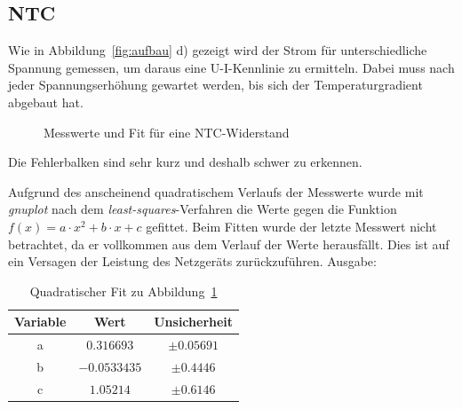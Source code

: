 \subsection{NTC}
Wie in Abbildung~\ref{fig:aufbau} d) gezeigt wird der Strom für unterschiedliche Spannung gemessen, um daraus eine U-I-Kennlinie zu ermitteln. Dabei muss nach jeder Spannungserhöhung gewartet werden, bis sich der Temperaturgradient abgebaut hat. 

\begin{figure}[H]
\centering
{}
\caption{Messwerte und Fit für eine NTC-Widerstand}
\label{fig:ntc}
\end{figure}
Die Fehlerbalken sind sehr kurz und deshalb schwer zu erkennen.

Aufgrund des anscheinend quadratischem Verlaufs der Messwerte wurde mit \emph{gnuplot} nach dem \emph{least-squares}-Verfahren die Werte gegen die Funktion $f(x)=a\cdot x^2+b\cdot x+c$ gefittet. Beim Fitten wurde der letzte Messwert nicht betrachtet, da er vollkommen aus dem Verlauf der Werte herausfällt. Dies ist auf ein Versagen der Leistung des Netzgeräts zurückzuführen. Ausgabe:
\begin{table}[H]
  \centering
  \begin{tabular}{c | c | c }
    Variable   & Wert & Unsicherheit\\ \hline
    a & $\num{0,316693}$ & $\pm\num{0,05691}$ \\
    b & $\num{-0,0533435}$ & $\pm\num{0,4446}$ \\
    c & $\num{1,05214}$ & $\pm\num{0,6146}$ \\
  \end{tabular}
  \caption{Quadratischer Fit zu Abbildung~\ref{fig:ntc}}
  \label{tab:fitntc}
\end{table}
